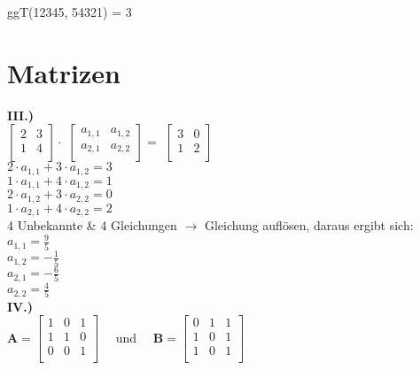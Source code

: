 \documentclass[12pt]{scrartcl}
\begin{document}
ggT(12345, 54321) = 3\\


\newpage
\section{Matrizen}
\textbf{III.)}\\

$\begin{bmatrix}
2 & 3 \\
1 & 4 \\
\end{bmatrix} \cdot
$
$
\begin{bmatrix}
a_{1,1} & a_{1,2} \\
a_{2,1} & a_{2,2} \\
\end{bmatrix} =
$
$
\begin{bmatrix}
3 & 0 \\
1 & 2 \\
\end{bmatrix}
$\\

$2 \cdot a_{1,1} + 3 \cdot a_{1, 2} = 3$\\
$1 \cdot a_{1,1} + 4 \cdot a_{1, 2} = 1$\\
$2 \cdot a_{1,2} + 3 \cdot a_{2, 2} = 0$\\
$1 \cdot a_{2,1} + 4 \cdot a_{2, 2} = 2$\\


4 Unbekannte \& 4 Gleichungen $\rightarrow$ Gleichung auflösen, daraus ergibt sich:\\
$a_{1,1} = \frac{9}{5}$\\
$a_{1,2} = -\frac{1}{5}$\\
$a_{2,1} = -\frac{6}{5}$\\
$a_{2,2} = \frac{4}{5}$\\




\textbf{IV.)}\\
$\mathbf{A} = 
\begin{bmatrix}
1 & 0 & 1 \\
1 & 1 & 0 \\
0 & 0 & 1 \\
\end{bmatrix} \quad
$ und
$\quad \mathbf{B} = 
\begin{bmatrix}
0 & 1 & 1 \\
1 & 0 & 1 \\
1 & 0 & 1 \\
\end{bmatrix}
$\\
\end{document}
